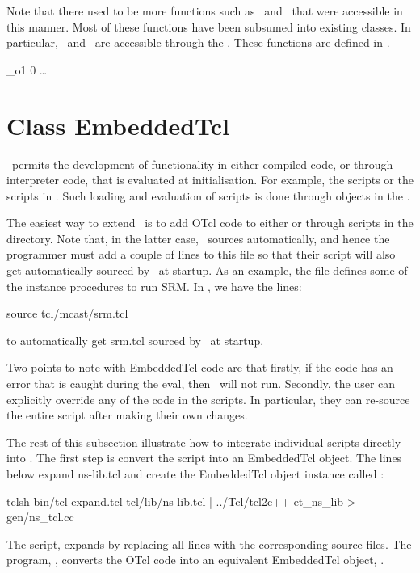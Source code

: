 Note that there used to be more functions such as \ and
\ that were accessible in this manner.
Most of these functions have been subsumed into existing classes.
In particular, \ and \ are accessible
through the
.
These functions are defined in .
\begin{program}
            _o1
            0
            \ldots
\end{program}
          

\section{Class EmbeddedTcl}
\label{sec:EmbeddedTcl}

\ns\ permits the development of functionality in either compiled code,
or through interpreter code, that is evaluated at initialisation.
For example, the scripts  or the scripts in
.
Such loading and evaluation of scripts is done through objects in the
.

The easiest way to extend \ns\ is to add OTcl code
to either  or through scripts
in the  directory.
Note that, in the latter case, \ns\ sources
 automatically, and hence
the programmer must add a couple of lines to this file
so that their script will also get automatically sourced by \ns\
at startup.
As an example,
the file  defines some of the instance procedures
to run SRM.
In , we have the lines:
\begin{program}
	source tcl/mcast/srm.tcl
\end{program}
to automatically get srm.tcl sourced by \ns\ at startup.

Two points to note with EmbeddedTcl code are that
firstly, if the code has an error that is caught during the eval,
then \ns\ will not run.
Secondly, the user can explicitly override any of the code in the scripts.
In particular, they can re-source the entire script after making their own
changes. 

The rest of this subsection illustrate
how to integrate individual scripts directly into \ns.
The first step is convert the script into an EmbeddedTcl object.
The lines below expand ns-lib.tcl and create the EmbeddedTcl object
instance called \code{et_ns_lib}:
\begin{program}
        tclsh bin/tcl-expand.tcl tcl/lib/ns-lib.tcl | \bs
                               ../Tcl/tcl2c++ et_ns_lib > gen/ns_tcl.cc
\end{program}
The script, 
expands \code{ns-lib.tcl} by replacing all \code{source} lines
with the corresponding source files.
The program, ,
converts the OTcl code into an equivalent EmbeddedTcl object, .

